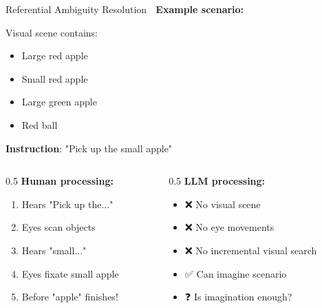 \documentclass[aspectratio=169]{beamer}
\begin{document}
\begin{frame}[shrink=10]{Referential Ambiguity Resolution 🎯}
    \textbf{Example scenario:}

    \vspace{0.3cm}

    Visual scene contains:
    \begin{itemize}\setlength{\itemsep}{0pt}
        \item Large red apple
        \item Small red apple
        \item Large green apple
        \item Red ball
    \end{itemize}

    \vspace{0.3cm}

    \textbf{Instruction}: "Pick up the small apple"

    \vspace{0.3cm}

    \begin{columns}[T]
        \begin{column}{0.5\textwidth}
            \textbf{Human processing:}
            \begin{enumerate}\setlength{\itemsep}{0pt}
                \item Hears "Pick up the..."
                \item Eyes scan objects
                \item Hears "small..."
                \item Eyes fixate small apple
                \item Before "apple" finishes!
            \end{enumerate}
        \end{column}

        \begin{column}{0.5\textwidth}
            \textbf{LLM processing:}
            \begin{itemize}\setlength{\itemsep}{0pt}
                \item ❌ No visual scene
                \item ❌ No eye movements
                \item ❌ No incremental visual search
                \item ✅ Can imagine scenario
                \item ❓ Is imagination enough?
            \end{itemize}
        \end{column}
    \end{columns}
\end{frame}
\end{document}
